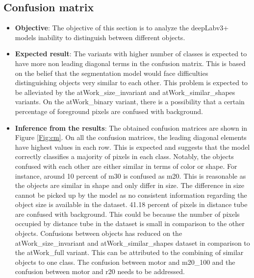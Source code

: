 	\subsection{Confusion matrix}
		\begin{itemize}
			\item \textbf{Objective}: The objective of this section is to analyze the deepLabv3+ models inability to distinguish between different objects. 
			\item \textbf{Expected result}: The variants with higher number of classes is expected to have more non leading diagonal terms in the confusion matrix. This is based on the belief that the segmentation model would face difficulties distinguishing objects very similar to each other. This problem is expected to be alleviated by the atWork\_size\_invariant and atWork\_similar\_shapes variants. On the atWork\_binary variant, there is a possibility that a certain percentage of foreground pixels are confused with background.
			\item \textbf{Inference from the results}: The obtained confusion matrices are shown in Figure \ref{Fig:cm}. On all the confusion matrices, the leading diagonal elements have highest values in each row. This is expected and suggests that the model correctly classifies a majority of pixels in each class. Notably, the objects confused with each other are either similar in terms of color or shape. For instance, around 10 percent of m30 is confused as m20. This is reasonable as the objects are similar in shape and only differ in size. The difference in size cannot be picked up by the model as no consistent information regarding the object size is available in the dataset. 41.18 percent of pixels in distance tube are confused with background. This could be because the number of pixels occupied by distance tube in the dataset is small in comparison to the other objects.
			Confusions between objects has reduced on the atWork\_size\_invariant and atWork\_similar\_shapes dataset in comparison to the atWork\_full variant. This can be attributed to the combining of similar objects to one class. The confusion between motor and m20\_100 and the confusion between motor and r20 needs to be addressed.
		\end{itemize}

